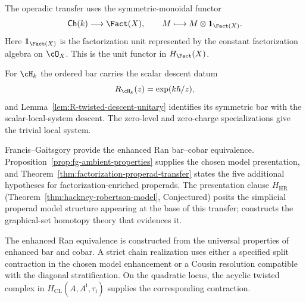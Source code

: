 \begin{remark}
\label{rem:ainf2-heal-70}

The operadic transfer uses the symmetric-monoidal functor
\[
 \mathsf{Ch}(k)\longrightarrow\Fact(X),
 \qquad M\longmapsto M\otimes\mathbf 1_{\Fact(X)}.
\]
Here $\mathbf 1_{\Fact(X)}$ is the factorization unit represented by
the constant factorization algebra on $\cO_X$.  This is the unit
functor in $H_{\Fact}(X)$.
\end{remark}

\begin{remark}
\label{rem:ainf2-heal-71}

For $\cH_k$ the ordered bar carries the scalar descent datum
\[
R_{\cH_k}(z)=\exp(k\hbar/z),
\]
and Lemma~\ref{lem:R-twisted-descent-unitary} identifies its symmetric
bar with the scalar-local-system descent.  The zero-level and
zero-charge specializations give the trivial local system.
\end{remark}

\begin{remark}
\label{rem:ainf2-heal-72}

Francis--Gaitsgory provide the enhanced Ran bar--cobar equivalence.
Proposition~\ref{prop:fg-ambient-properties} supplies the chosen model
presentation, and Theorem~\ref{thm:factorization-properad-transfer}
states the five additional hypotheses for factorization-enriched
properads.  The presentation clause $H_{\mathrm{HR}}$
(Theorem~\ref{thm:hackney-robertson-model}, Conjectured) posits the
simplicial properad model structure appearing at the base of this
transfer; \cite{HRY17} constructs the graphical-set homotopy theory
that evidences it.
\end{remark}

\begin{remark}
\label{rem:ainf2-heal-73}

The enhanced Ran equivalence is constructed from the universal
properties of enhanced bar and cobar.  A strict chain realization uses
either a specified split contraction in the chosen model enhancement
or a Cousin resolution compatible with the diagonal stratification.
On the quadratic locus, the acyclic twisted complex in
$H_{\mathrm{CL}}(A,A^{\mathrm i},\tau_{\mathrm i})$ supplies the corresponding
contraction.
\end{remark}


